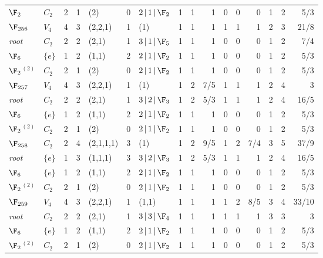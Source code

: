\begin{landscape}
{\begin{longtable}{@{}l l r r l r l rrr rrr rrr@{}}
\quad$\F_{2}$ & $C_{2}$ & 2 & 1 & (2) & 0 & $2\,|\,1\,|\,\F_{2}$ & 1 & 1 & 1 & 0 & 0 & 0 & 1 & 2 & 5/3 \\
\addlinespace[3pt]
\textbf{$\F_{256}$} & $V_{4}$ & 4 & 3 & (2,2,1) & 1 & (1) & 1 & 1 & 1 & 1 & 1 & 1 & 2 & 3 & 21/8 \\
\quad\textit{root} & $C_{2}$ & 2 & 2 & (2,1) & 1 & $3\,|\,1\,|\,\F_{5}$ & 1 & 1 & 1 & 0 & 0 & 0 & 1 & 2 & 7/4 \\
\quad$\F_{6}$ & $\{e\}$ & 1 & 2 & (1,1) & 2 & $2\,|\,1\,|\,\F_{2}$ & 1 & 1 & 1 & 0 & 0 & 0 & 1 & 2 & 5/3 \\
\quad$\F_{2}$$^{(2)}$ & $C_{2}$ & 2 & 1 & (2) & 0 & $2\,|\,1\,|\,\F_{2}$ & 1 & 1 & 1 & 0 & 0 & 0 & 1 & 2 & 5/3 \\
\addlinespace[3pt]
\textbf{$\F_{257}$} & $V_{4}$ & 4 & 3 & (2,2,1) & 1 & (1) & 1 & 2 & 7/5 & 1 & 1 & 1 & 2 & 4 & 3 \\
\quad\textit{root} & $C_{2}$ & 2 & 2 & (2,1) & 1 & $3\,|\,2\,|\,\F_{3}$ & 1 & 2 & 5/3 & 1 & 1 & 1 & 2 & 4 & 16/5 \\
\quad$\F_{6}$ & $\{e\}$ & 1 & 2 & (1,1) & 2 & $2\,|\,1\,|\,\F_{2}$ & 1 & 1 & 1 & 0 & 0 & 0 & 1 & 2 & 5/3 \\
\quad$\F_{2}$$^{(2)}$ & $C_{2}$ & 2 & 1 & (2) & 0 & $2\,|\,1\,|\,\F_{2}$ & 1 & 1 & 1 & 0 & 0 & 0 & 1 & 2 & 5/3 \\
\addlinespace[3pt]
\textbf{$\F_{258}$} & $C_{2}$ & 2 & 4 & (2,1,1,1) & 3 & (1) & 1 & 2 & 9/5 & 1 & 2 & 7/4 & 3 & 5 & 37/9 \\
\quad\textit{root} & $\{e\}$ & 1 & 3 & (1,1,1) & 3 & $3\,|\,2\,|\,\F_{3}$ & 1 & 2 & 5/3 & 1 & 1 & 1 & 2 & 4 & 16/5 \\
\quad$\F_{6}$ & $\{e\}$ & 1 & 2 & (1,1) & 2 & $2\,|\,1\,|\,\F_{2}$ & 1 & 1 & 1 & 0 & 0 & 0 & 1 & 2 & 5/3 \\
\quad$\F_{2}$$^{(2)}$ & $C_{2}$ & 2 & 1 & (2) & 0 & $2\,|\,1\,|\,\F_{2}$ & 1 & 1 & 1 & 0 & 0 & 0 & 1 & 2 & 5/3 \\
\addlinespace[3pt]
\textbf{$\F_{259}$} & $V_{4}$ & 4 & 3 & (2,2,1) & 1 & (1,1) & 1 & 1 & 1 & 1 & 2 & 8/5 & 3 & 4 & 33/10 \\
\quad\textit{root} & $C_{2}$ & 2 & 2 & (2,1) & 1 & $3\,|\,3\,|\,\F_{4}$ & 1 & 1 & 1 & 1 & 1 & 1 & 3 & 3 & 3 \\
\quad$\F_{6}$ & $\{e\}$ & 1 & 2 & (1,1) & 2 & $2\,|\,1\,|\,\F_{2}$ & 1 & 1 & 1 & 0 & 0 & 0 & 1 & 2 & 5/3 \\
\quad$\F_{2}$$^{(2)}$ & $C_{2}$ & 2 & 1 & (2) & 0 & $2\,|\,1\,|\,\F_{2}$ & 1 & 1 & 1 & 0 & 0 & 0 & 1 & 2 & 5/3 \\

\end{longtable}}
\end{landscape}
